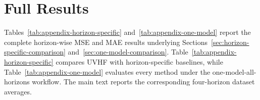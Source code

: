 \documentclass[final,3p,times]{elsarticle}
\begin{document}
\setcounter{table}{0}
\setcounter{figure}{0}
\section{Full Results}
\label{app:full-results}


Tables~\ref{tab:appendix-horizon-specific} and~\ref{tab:appendix-one-model} report the complete horizon-wise MSE and MAE results underlying Sections~\ref{sec:horizon-specific-comparison} and~\ref{sec:one-model-comparison}. Table~\ref{tab:appendix-horizon-specific} compares UVHF with horizon-specific baselines, while Table~\ref{tab:appendix-one-model} evaluates every method under the one-model-all-horizons workflow. The main text reports the corresponding four-horizon dataset averages.

\end{document}

